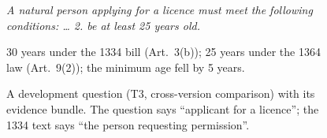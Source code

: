 \begin{figure}[tp]
\begin{tcolorbox}[excard, title={Evidence bundle\enspace two documents}]
\begin{tcolorbox}[exdoc, colframe=cLex, colback=cLex!6]
\begin{otherlanguage}{persian}
\end{otherlanguage}
{\footnotesize\color{cAxis}\textit{A natural person applying for a licence must meet the following conditions: \ldots{} 2. be at least 25 years old.}\par}
\end{tcolorbox}
\end{tcolorbox}
\begin{tcolorbox}[excard, title={Expected answer\enspace gloss}]
30 years under the 1334 bill (Art.~3(b)); 25 years under the 1364 law (Art.~9(2)); the minimum age fell by 5 years.
\end{tcolorbox}
\caption{A development question (T3, cross-version comparison) with its evidence bundle. The question says ``applicant for a licence''; the 1334 text says ``the person requesting permission''.}
\label{fig:example}
\end{figure}
